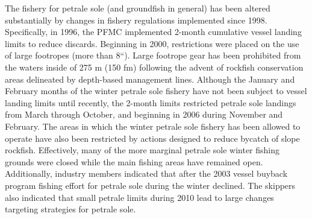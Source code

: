 \documentclass[12pt,]{article}
\begin{document}
The fishery for petrale sole (and groundfish in general) has been
altered substantially by changes in fishery regulations implemented
since 1998. Specifically, in 1996, the PFMC implemented 2-month
cumulative vessel landing limits to reduce discards. Beginning in 2000,
restrictions were placed on the use of large footropes (more than 8``).
Large footrope gear has been prohibited from the waters inside of 275 m
(150 fm) following the advent of rockfish conservation areas delineated
by depth-based management lines. Although the January and February
months of the winter petrale sole fishery have not been subject to
vessel landing limits until recently, the 2-month limits restricted
petrale sole landings from March through October, and beginning in 2006
during November and February. The areas in which the winter petrale sole
fishery has been allowed to operate have also been restricted by actions
designed to reduce bycatch of slope rockfish. Effectively, many of the
more marginal petrale sole winter fishing grounds were closed while the
main fishing areas have remained open. Additionally, industry members
indicated that after the 2003 vessel buyback program fishing effort for
petrale sole during the winter declined. The skippers also indicated
that small petrale limits during 2010 lead to large changes targeting
strategies for petrale sole.
\end{document}
